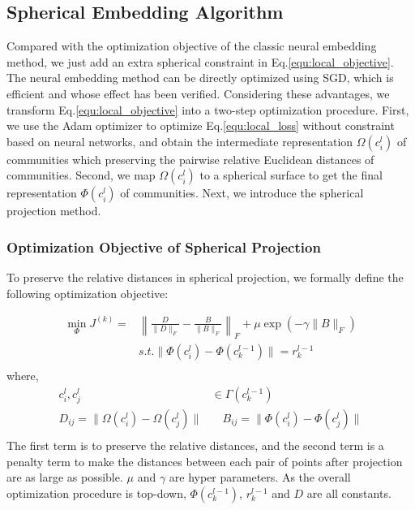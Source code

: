 \documentclass{article}
\theoremstyle{definition}
\begin{document}
	 \subsection{Spherical Embedding Algorithm}
	 Compared with the optimization objective of the classic neural embedding method, we just add an extra spherical constraint in Eq.\ref{equ:local_objective}. The neural embedding method can be directly optimized using SGD, which is efficient and whose effect has been verified. Considering these advantages, we transform Eq.\ref{equ:local_objective} into a two-step optimization procedure. First, we use the Adam optimizer \cite{Rushing2005ADaM} to optimize Eq.\ref{equ:local_loss} without constraint based on neural networks, and obtain the intermediate representation $\Omega(c^l_i)$ of communities which preserving the pairwise relative Euclidean distances of communities. Second, we map $\Omega(c^l_i)$ to a spherical surface to get the final representation $\Phi(c_i^l)$ of communities. Next, we introduce the spherical projection method.

	 \subsubsection{Optimization Objective of Spherical Projection}
	 To preserve the relative distances in spherical projection, we formally define the following optimization objective: 

    \begin{equation}
    \label{equ:sphere_objective}
    \begin{split}
    \min_{\Phi} J^{(k)} =  & \left\lVert\frac{D}{\lVert D \rVert_F} - \frac{B}{\lVert B \rVert_F}\right\rVert_F + \mu \exp(- \gamma \lVert B \rVert_F)\\ 
    & s.t. \lVert \Phi(c_i^{l})  - \Phi(c_k^{l-1})\rVert= r_k^{l-1}\\
    \end{split}
    \end{equation}
	 where,
	 \[
	 \begin{split}
	 	c_i^l,c_j^l &\in \Gamma(c_k^{l-1})\\
	 	D_{ij} = \lVert \Omega(c^{l}_i) - \Omega(c^{l}_j)\rVert &\quad B_{ij} = \lVert \Phi(c^{l}_i) - \Phi(c^{l}_j)\rVert \\
	 \end{split}
	 \]
	 The first term is to preserve the relative distances, and the second term is a penalty term to make the distances between each pair of points after projection are as large as possible. $\mu$ and $\gamma$ are hyper parameters. As the overall optimization procedure is top-down, $\Phi(c_k^{l-1})$, $r_k^{l-1}$ and $D$ are all constants. 
   
\end{document}
